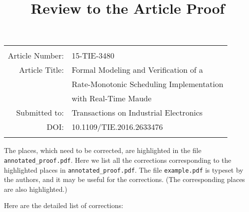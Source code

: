 \documentclass[12pt,onecolumn]{IEEEtranTIE}
\begin{document}
\title{Review to the Article Proof}
\date{}

\maketitle
\vspace{-30pt}
\begin{center}
  \begin{tabular}{r l}
    \hline\hline
    & \\
    Article Number: & 15-TIE-3480\\
    Article Title: & Formal Modeling and Verification of a \\
    & Rate-Monotonic Scheduling Implementation \\
    & with Real-Time Maude \\
    Submitted to: & Transactions on Industrial Electronics \\
    DOI: & 10.1109/TIE.2016.2633476 \\
    & \\
    \hline\hline
  \end{tabular}
  \bigskip
\end{center}

\newcommand{\by}{$\rightarrow$ }


\medskip
The places, which need to be corrected, are highlighted in the file
\verb|annotated_proof.pdf|. Here we list all the corrections
corresponding to the highlighted places in
\verb|annotated_proof.pdf|. The file \verb|example.pdf| is typeset by
the authors, and it may be useful for the corrections. (The
corresponding places are also highlighted.)

\medskip
Here are the detailed list of corrections:
\end{document}
